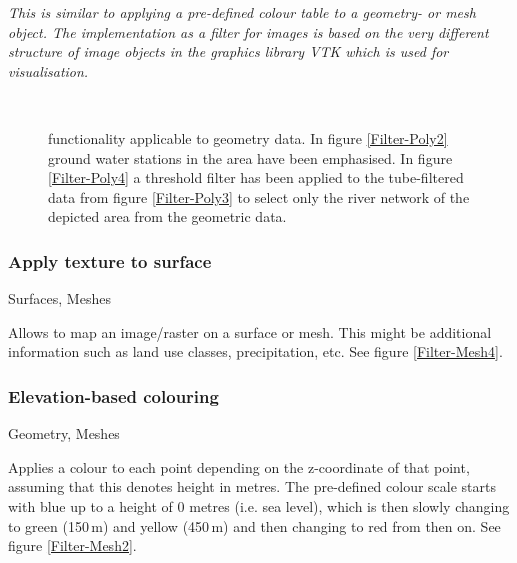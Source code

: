  \emph{This is similar to applying a pre-defined colour table to a geometry- or mesh object. The implementation as a filter for images is based on the very different structure of image objects in the graphics library VTK which is used for visualisation.}

\begin{figure}[tb]
\begin{center}
\enspace
{} \\
\enspace
{}
\end{center}
\caption{\ogs functionality applicable to geometry data. In figure \ref{Filter-Poly2} ground water stations in the area have been emphasised. In figure \ref{Filter-Poly4} a threshold filter has been applied to the tube-filtered data from figure \ref{Filter-Poly3} to select only the river network of the depicted area from the geometric data.} \label{fig:filter:poly}
\end{figure}

\subsubsection{Apply texture to surface}
 Surfaces, Meshes

 Allows to map an image/raster on a surface or mesh. This might be additional information such as land use classes, precipitation, etc. See figure \ref{Filter-Mesh4}.

\subsubsection{Elevation-based colouring}
 Geometry, Meshes

 Applies a colour to each point depending on the z-coordinate of that point, assuming that this denotes height in metres. The pre-defined colour scale starts with blue up to a height of $0$ metres (i.e. sea level), which is then slowly changing to green (150\,m) and yellow (450\,m) and then changing to red from then on. See figure \ref{Filter-Mesh2}.

